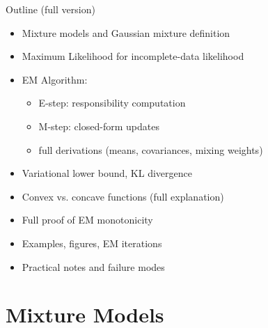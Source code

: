 \documentclass[serif, aspectratio=169]{beamer}
\begin{document}
\begin{frame}{Outline (full version)}
\begin{itemize}
    \item Mixture models and Gaussian mixture definition
    \item Maximum Likelihood for incomplete-data likelihood
    \item EM Algorithm:
    \begin{itemize}
        \item E-step: responsibility computation
        \item M-step: closed-form updates
        \item full derivations (means, covariances, mixing weights)
    \end{itemize}
    \item Variational lower bound, KL divergence
    \item Convex vs. concave functions (full explanation)
    \item Full proof of EM monotonicity  
    \item Examples, figures, EM iterations  
    \item Practical notes and failure modes  
\end{itemize}
\end{frame}

\section{Mixture Models}
\end{document}
